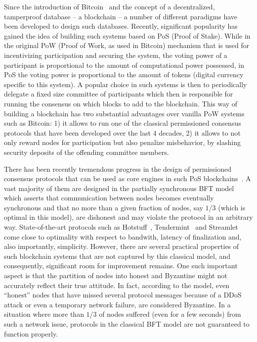 \documentclass[12pt, fleqn]{article}
\begin{document}
Since the introduction of Bitcoin~\cite{nakamoto2008bitcoin} and the concept of a decentralized, tamperproof database -- a blockchain -- a number of different paradigms have been developed to design such databases.
%
Recently, significant popularity has gained the idea of building such systems based on PoS (Proof of Stake).
%
While in the original PoW (Proof of Work, as used in Bitcoin) mechanism that is used for incentivizing participation and securing the system, the voting power of a participant is proportional to the amount of computational power possessed, in PoS the voting power is proportional to the amount of tokens (digital currency specific to this system).
%
A popular choice in such systems is then to periodically delegate a fixed size committee of participants which then is responsible for running the consensus on which blocks to add to the blockchain.
%
This way of building a blockchain has two substantial advantages over vanilla PoW systems such as Bitcoin: 1) it allows to run one of the classical permissioned consensus protocols that have been developed over the last 4 decades, 2) it allows to not only reward nodes for participation but also penalize misbehavior, by slashing security deposits of the offending committee members.
%

There has been recently tremendous progress in the design of permissioned consensus protocols that can be used as core engines in such PoS blockchains~\cite{BG17,YMRGA19,AMNRY19,BKM18,CS20,BKM18,GAGMPRSTT19,zamfir2018casper,GLSS19}.
%
A vast majority of them are designed in the partially synchronous BFT model~\cite{DLS88} which asserts that communication between nodes becomes eventually synchronous and that no more than a given fraction of nodes, say $1/3$ (which is optimal in this model), are dishonest and may violate the protocol in an arbitrary way.
%
State-of-the-art protocols such as Hotstuff~\cite{YMRGA19}, Tendermint~\cite{BG17} and Streamlet~\cite{CS20} come close to optimality with respect to bandwith, latency of finalization and, also importantly, simplicity.
%
However, there are several practical properties of such blockchain systems that are not captured by this classical model, and consequently, significant room for improvement remains.
%
One such important aspect is that the partition of nodes into honest and Byzantine might not accurately reflect their true attitude.
%
In fact, according to the model, even ``honest'' nodes that have missed several protocol messages because of a DDoS attack or even a temporary network failure, are considered Byzantine.
%
In a situation where more than $1/3$ of nodes suffered (even for a few seconds) from such a network issue, protocols in the classical BFT model are not guaranteed to function properly.
\end{document}
